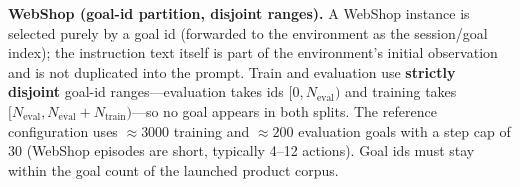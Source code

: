 \textbf{WebShop (goal-id partition, disjoint ranges).} A WebShop instance is selected
purely by a goal id (forwarded to the environment as the session/goal index); the
instruction text itself is part of the environment's initial observation and is not
duplicated into the prompt. Train and evaluation use \textbf{strictly disjoint} goal-id
ranges---evaluation takes ids $[0, N_{\mathrm{eval}})$ and training takes
$[N_{\mathrm{eval}}, N_{\mathrm{eval}}+N_{\mathrm{train}})$---so no goal appears in both
splits. The reference configuration uses $\approx3000$ training and $\approx200$
evaluation goals with a step cap of $30$ (WebShop episodes are short, typically 4--12
actions). Goal ids must stay within the goal count of the launched product corpus.

